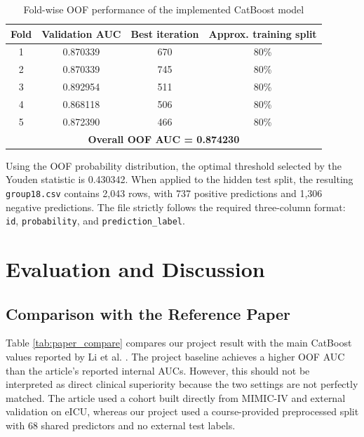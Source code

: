 \documentclass[a4paper,12pt]{extreport}
\begin{document}
\begin{table}[H]
    \centering
    \caption{Fold-wise OOF performance of the implemented CatBoost model}
    \label{tab:fold_results}
    \begin{tabular}{cccc}
        \toprule
        \textbf{Fold} & \textbf{Validation AUC} & \textbf{Best iteration} & \textbf{Approx. training split} \\
        \midrule
        1 & 0.870339 & 670 & 80\% \\
        2 & 0.870339 & 745 & 80\% \\
        3 & 0.892954 & 511 & 80\% \\
        4 & 0.868118 & 506 & 80\% \\
        5 & 0.872390 & 466 & 80\% \\
        \midrule
        \multicolumn{4}{c}{\textbf{Overall OOF AUC = 0.874230}} \\
        \bottomrule
    \end{tabular}
\end{table}

Using the OOF probability distribution, the optimal threshold selected by the Youden statistic is 0.430342. When applied to the hidden test split, the resulting \texttt{group18.csv} contains 2{,}043 rows, with 737 positive predictions and 1{,}306 negative predictions. The file strictly follows the required three-column format: \texttt{id}, \texttt{probability}, and \texttt{prediction\_label}.

\section{Evaluation and Discussion}

\subsection{Comparison with the Reference Paper}
Table \ref{tab:paper_compare} compares our project result with the main CatBoost values reported by Li et al. \cite{li2022prediction}. The project baseline achieves a higher OOF AUC than the article's reported internal AUCs. However, this should not be interpreted as direct clinical superiority because the two settings are not perfectly matched. The article used a cohort built directly from MIMIC-IV and external validation on eICU, whereas our project used a course-provided preprocessed split with 68 shared predictors and no external test labels.
\end{document}
